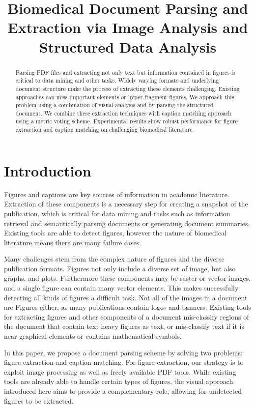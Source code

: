 \documentclass{article}
\title{Biomedical Document Parsing and Extraction via Image Analysis and Structured Data Analysis}
\begin{document}
\maketitle


\begin{abstract}
Parsing PDF files and extracting not only text but information contained in figures is critical to data mining and other tasks. Widely varying formats and underlying document structure make the process of extracting these elements challenging. Existing approaches can miss important elements or hyper-fragment figures. We approach this problem using a combination of visual analysis and by parsing the structured document. We combine these extraction techniques with caption matching approach using a metric voting scheme. Experimental results show robust performance for figure extraction and caption matching on challenging biomedical literature.
\end{abstract}

\section{Introduction}
Figures and captions are key sources of information in academic literature. Extraction of these components is a necessary step for creating a snapshot of the publication, which is critical for data mining and tasks such as information retrieval and semantically parsing documents or generating document summaries. Existing tools are able to detect figures, however the nature of biomedical literature means there are many failure cases.

Many challenges stem from the complex nature of figures and the diverse publication formats. Figures not only include a diverse set of image, but also graphs, and plots. Furthermore these components may be raster or vector images, and a single figure can contain many vector elements. This makes successfully detecting all kinds of figures a difficult task. Not all of the images in a document are Figures either, as many publications contain logos and banners. Existing tools for extracting figures and other components of a document mis-classify regions of the document that contain text heavy figures as text, or mis-classify  text if it is near graphical elements or contains mathematical symbols.  

In this paper, we propose a document parsing scheme by solving two problems: figure extraction and caption matching. For figure extraction, our strategy is to exploit image processing as well as freely available PDF tools. While existing tools are already able to handle certain types of figures, the visual approach introduced here aims to provide a complementary role, allowing for undetected figures to be extracted. 
\end{document}
